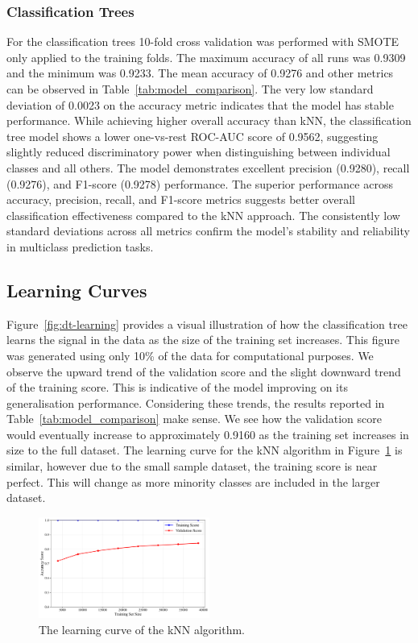 \documentclass[10pt, conference]{IEEEtran}
\begin{document}
\subsubsection{Classification Trees}
For the classification trees 10-fold cross validation was performed with SMOTE only applied to the training folds. The maximum accuracy of all runs was 0.9309 and the minimum was 0.9233. The mean accuracy of 0.9276 and other metrics can be observed in Table~\ref{tab:model_comparison}. The very low standard deviation of 0.0023 on the accuracy metric indicates that the model has stable performance. While achieving higher overall accuracy than kNN, the classification tree model shows a lower one-vs-rest ROC-AUC score of 0.9562, suggesting slightly reduced discriminatory power when distinguishing between individual classes and all others. The model demonstrates excellent precision (0.9280), recall (0.9276), and F1-score (0.9278) performance. The superior performance across accuracy, precision, recall, and F1-score metrics suggests better overall classification effectiveness compared to the kNN approach. The consistently low standard deviations across all metrics confirm the model's stability and reliability in multiclass prediction tasks.

\subsection{Learning Curves}
Figure~\ref{fig:dt-learning} provides a visual illustration of how the classification tree learns the signal in the data as the size of the training set increases. This figure was generated using only 10\% of the data for computational purposes. We observe the upward trend of the validation score and the slight downward trend of the training score. This is indicative of the model improving on its generalisation performance. Considering these trends, the results reported in Table~\ref{tab:model_comparison} make sense. We see how the validation score would eventually increase to approximately 0.9160 as the training set increases in size to the full dataset. The learning curve for the kNN algorithm in Figure~\ref{fig:knn-learning} is similar, however due to the small sample dataset, the training score is near perfect. This will change as more minority classes are included in the larger dataset.

\begin{figure}[htbp]
	\centering
	\includegraphics[width=0.5\textwidth]{../plots/knn_learning_curve.pdf}
	\caption{The learning curve of the kNN algorithm.}
	\label{fig:knn-learning}
\end{figure}
\end{document}
